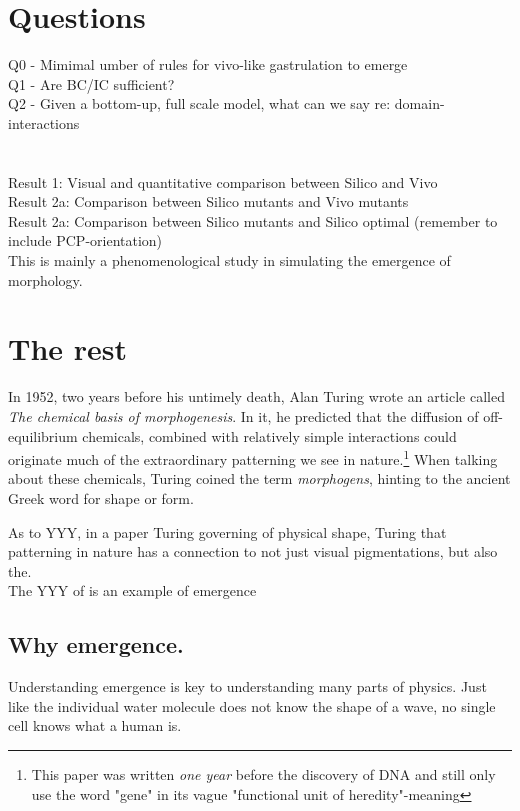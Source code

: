 
\section{Questions}
Q0 - Mimimal umber of rules for vivo-like gastrulation to emerge\\
Q1 - Are BC/IC sufficient?\\
Q2 - Given a bottom-up, full scale model, what can we say re: domain-interactions\\
\\\\
Result 1: Visual and quantitative comparison between Silico and Vivo\\
Result 2a: Comparison between Silico mutants and Vivo mutants\\
Result 2a: Comparison between Silico mutants and Silico optimal (remember to include PCP-orientation)\\

This is mainly a phenomenological study in simulating the emergence of morphology.
\section{The rest}
In 1952, two years before his untimely death, Alan Turing wrote an article called
\textit{The chemical basis of morphogenesis}.\cite{turing52the} In it, he predicted that the diffusion of off-equilibrium chemicals, combined with relatively simple interactions could originate much of the extraordinary patterning we see in nature.\footnote{This paper was written \textit{one year} before the discovery of DNA and still only use the word "gene" in its vague "functional unit of heredity"-meaning} When talking about these chemicals, Turing coined the term \textit{morphogens}, hinting to the ancient Greek word for shape or form. 

As to YYY, in a paper Turing governing of physical shape, Turing that patterning in nature has a connection to not just visual pigmentations, but also the. \\


The YYY of is an example of emergence
\subsection{Why emergence. }

Understanding emergence is key to understanding many parts of physics. Just like the individual water molecule does not know the shape of a wave, no single cell knows what a human is. 

